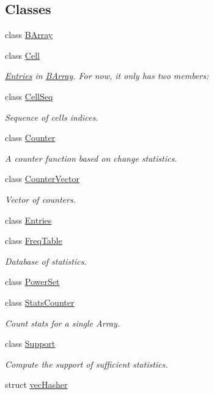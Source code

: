 \subsection*{Classes}
\begin{DoxyCompactItemize}
\item 
class \hyperlink{classbarry_1_1_b_array}{B\+Array}
\item 
class \hyperlink{classbarry_1_1_cell}{Cell}
\begin{DoxyCompactList}\small\item\em \hyperlink{classbarry_1_1_entries}{Entries} in \hyperlink{classbarry_1_1_b_array}{B\+Array}. For now, it only has two members\+: \end{DoxyCompactList}\item 
class \hyperlink{classbarry_1_1_cell_seq}{Cell\+Seq}
\begin{DoxyCompactList}\small\item\em Sequence of cells indices. \end{DoxyCompactList}\item 
class \hyperlink{classbarry_1_1_counter}{Counter}
\begin{DoxyCompactList}\small\item\em A counter function based on change statistics. \end{DoxyCompactList}\item 
class \hyperlink{classbarry_1_1_counter_vector}{Counter\+Vector}
\begin{DoxyCompactList}\small\item\em Vector of counters. \end{DoxyCompactList}\item 
class \hyperlink{classbarry_1_1_entries}{Entries}
\item 
class \hyperlink{classbarry_1_1_freq_table}{Freq\+Table}
\begin{DoxyCompactList}\small\item\em Database of statistics. \end{DoxyCompactList}\item 
class \hyperlink{classbarry_1_1_power_set}{Power\+Set}
\item 
class \hyperlink{classbarry_1_1_stats_counter}{Stats\+Counter}
\begin{DoxyCompactList}\small\item\em Count stats for a single Array. \end{DoxyCompactList}\item 
class \hyperlink{classbarry_1_1_support}{Support}
\begin{DoxyCompactList}\small\item\em Compute the support of sufficient statistics. \end{DoxyCompactList}\item 
struct \hyperlink{structbarry_1_1vec_hasher}{vec\+Hasher}
\end{DoxyCompactItemize}
